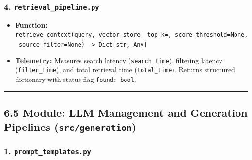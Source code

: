 \documentclass[
]{article}
\providecommand{\tightlist}{%
  \setlength{\itemsep}{0pt}\setlength{\parskip}{0pt}}
\begin{document}
\subsubsection{\texorpdfstring{4.
\texttt{retrieval\_\allowbreak pipeline.\allowbreak py}}{4. retrieval\_pipeline.py}}\label{retrieval_pipeline.py}

\begin{itemize}
\tightlist
\item
  \textbf{Function:}
  \texttt{retrieve\_\allowbreak context(\allowbreak query,\allowbreak \ \allowbreak vector\_\allowbreak store,\allowbreak \ \allowbreak top\_\allowbreak k=,\allowbreak \ \allowbreak score\_\allowbreak threshold=\allowbreak None,\allowbreak \ \allowbreak source\_\allowbreak filter=\allowbreak None)\allowbreak \ \allowbreak -\textgreater{}\allowbreak \ \allowbreak Dict{[}str,\allowbreak \ \allowbreak Any{]}}
\item
  \textbf{Telemetry:} Measures search latency (\texttt{search\_\allowbreak time}),
  filtering latency (\texttt{filter\_\allowbreak time}), and total retrieval time
  (\texttt{total\_\allowbreak time}). Returns structured dictionary with status flag
  \texttt{found:\ \allowbreak bool}.
\end{itemize}

\begin{center}\rule{0.5\linewidth}{0.5pt}\end{center}

\subsection{\texorpdfstring{6.5 Module: LLM Management and Generation
Pipelines
(\texttt{src/\allowbreak generation})}{6.5 Module: LLM Management and Generation Pipelines (src/generation)}}\label{module-llm-management-and-generation-pipelines-srcgeneration}

\subsubsection{\texorpdfstring{1.
\texttt{prompt\_\allowbreak templates.\allowbreak py}}{1. prompt\_templates.py}}\label{prompt_templates.py}
\end{document}
